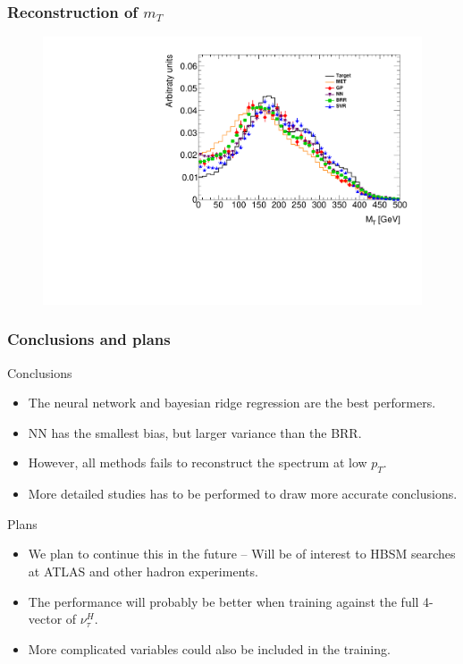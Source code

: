 \documentclass[9pt, lualatex]{beamer}
\begin{document}
\begin{frame}
    \frametitle{Reconstruction of $m_T$}

    \begin{figure}
        \centering
        \includegraphics[width=.7\textwidth]{plots/mt.pdf}
    \end{figure}
\end{frame}

\begin{frame}
    \frametitle{Conclusions and plans}

    Conclusions
    \begin{itemize}
        \item The neural network and bayesian ridge regression are the best performers.
        \item NN has the smallest bias, but larger variance than the BRR.
        \item However, all methods fails to reconstruct the spectrum at low $p_T$.
        \item More detailed studies has to be performed to draw more accurate conclusions.
    \end{itemize}

    \vfill

    Plans
    \begin{itemize}
        \item We plan to continue this in the future -- Will be of interest to HBSM searches at ATLAS and other hadron experiments.
        \item The performance will probably be better when training against the full 4-vector of $\nu_\tau^H$.
        \item More complicated variables could also be included in the training.
    \end{itemize}
\end{frame}
\end{document}

